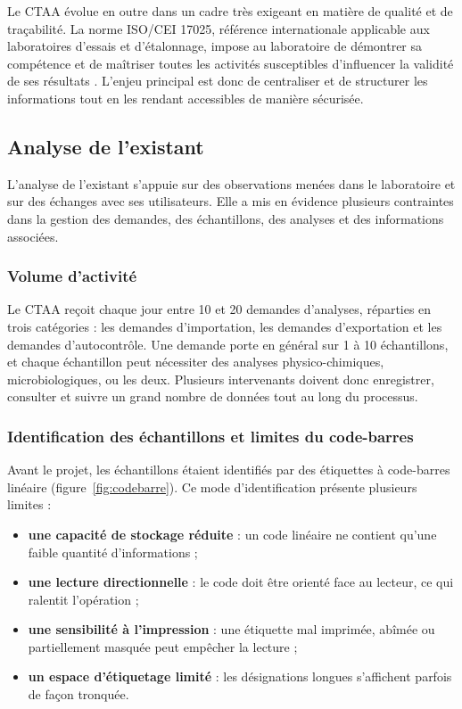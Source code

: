 Le \ac{CTAA} évolue en outre dans un cadre très exigeant en matière de qualité et de traçabilité. La norme \ac{ISO/CEI 17025}, référence internationale applicable aux laboratoires d'essais et d'étalonnage, impose au laboratoire de démontrer sa compétence et de maîtriser toutes les activités susceptibles d'influencer la validité de ses résultats \citep{iso17025}. L'enjeu principal est donc de centraliser et de structurer les informations tout en les rendant accessibles de manière sécurisée.

\subsection{Analyse de l'existant}

L'analyse de l'existant s'appuie sur des observations menées dans le laboratoire et sur des échanges avec ses utilisateurs. Elle a mis en évidence plusieurs contraintes dans la gestion des demandes, des échantillons, des analyses et des informations associées.

\subsubsection*{Volume d'activité}

Le \ac{CTAA} reçoit chaque jour entre 10 et 20 demandes d'analyses, réparties en trois catégories : les demandes d'importation, les demandes d'exportation et les demandes d'autocontrôle. Une demande porte en général sur 1 à 10 échantillons, et chaque échantillon peut nécessiter des analyses physico-chimiques, microbiologiques, ou les deux. Plusieurs intervenants doivent donc enregistrer, consulter et suivre un grand nombre de données tout au long du processus.

\subsubsection*{Identification des échantillons et limites du code-barres}

Avant le projet, les échantillons étaient identifiés par des étiquettes à code-barres linéaire (figure~\ref{fig:codebarre}). Ce mode d'identification présente plusieurs limites :
\begin{itemize}
    \item \textbf{une capacité de stockage réduite} : un code linéaire ne contient qu'une faible quantité d'informations \citep{iso15417} ;
    \item \textbf{une lecture directionnelle} : le code doit être orienté face au lecteur, ce qui ralentit l'opération ;
    \item \textbf{une sensibilité à l'impression} : une étiquette mal imprimée, abîmée ou partiellement masquée peut empêcher la lecture ;
    \item \textbf{un espace d'étiquetage limité} : les désignations longues s'affichent parfois de façon tronquée.
\end{itemize}

